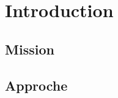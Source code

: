 \chapter{Introduction}
\label{chap:introduction}



\section{Mission}
\label{sec:intro_mission}


\section{Approche}
\label{sec:intro_approche}
